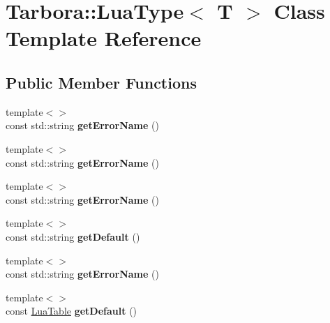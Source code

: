 \hypertarget{classTarbora_1_1LuaType}{}\section{Tarbora\+:\+:Lua\+Type$<$ T $>$ Class Template Reference}
\label{classTarbora_1_1LuaType}
\subsection*{Public Member Functions}
\begin{DoxyCompactItemize}
\item 
\mbox{\label{classTarbora_1_1LuaType_ad56fb3feb285a0f32b358a64581ea954}} 
{\footnotesize template$<$$>$ }\\const std\+::string {\bfseries get\+Error\+Name} ()
\item 
\mbox{\label{classTarbora_1_1LuaType_a166d9fe18e3ac5d1abebe492b6047fcc}} 
{\footnotesize template$<$$>$ }\\const std\+::string {\bfseries get\+Error\+Name} ()
\item 
\mbox{\label{classTarbora_1_1LuaType_a272136ce5811d144da6d26802795ad55}} 
{\footnotesize template$<$$>$ }\\const std\+::string {\bfseries get\+Error\+Name} ()
\item 
\mbox{\label{classTarbora_1_1LuaType_a6cd412aa4b3ab678f65e0e78c8ebd6e1}} 
{\footnotesize template$<$$>$ }\\const std\+::string {\bfseries get\+Default} ()
\item 
\mbox{\label{classTarbora_1_1LuaType_aa29f8fb65a8df75a45138842849a2927}} 
{\footnotesize template$<$$>$ }\\const std\+::string {\bfseries get\+Error\+Name} ()
\item 
\mbox{\label{classTarbora_1_1LuaType_ae5d7f8c582b33c5470b66d40c281e634}} 
{\footnotesize template$<$$>$ }\\const \hyperlink{classTarbora_1_1LuaTable}{Lua\+Table} {\bfseries get\+Default} ()
\item 

\end{DoxyCompactItemize}
